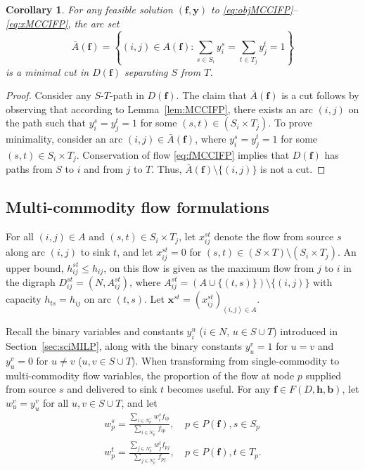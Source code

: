 \documentclass[pdflatex,sn-mathphys-num]{sn-jnl}%
\theoremstyle{thmstyleone}%
\newtheorem{corollary}[theorem]{Corollary}%
\begin{document}
\begin{corollary} \label{cor:MCCIFP}
For any feasible solution $(\boldsymbol{f},\boldsymbol{y})$ to \eqref{eq:objMCCIFP}--\eqref{eq:xMCCIFP},
the arc set \[\bar{A}(\boldsymbol{f})=\left\{(i,j)\in A(\boldsymbol{f}):\sum_{s\in S_i}y_i^s=\sum_{t\in T_j}y_j^t=1\right\}\] is a minimal cut in $D(\boldsymbol{f})$ separating $S$ from $T$.
\end{corollary}
\begin{proof}
Consider any $S$-$T$-path in $D(\boldsymbol{f})$.
The claim that $\bar{A}(\boldsymbol{f})$ is a cut follows by observing that according to Lemma~\ref{lem:MCCIFP}, there exists an arc $(i,j)$ on the path such that $y_i^s=y_j^t=1$ for some $(s,t)\in(S_i\times T_j)$.
To prove minimality, consider an arc $(i,j)\in\bar{A}(\boldsymbol{f})$, where $y_i^s=y_j^t=1$ for some $(s,t)\in S_i\times T_j$. Conservation of flow \eqref{eq:fMCCIFP} implies that $D(\boldsymbol{f})$ has paths from $S$ to $i$ and from $j$ to $T$. Thus, $\bar{A}(\boldsymbol{f})\setminus\{(i,j)\}$ is not a cut. 
\end{proof}

\subsection{Multi-commodity flow formulations} \label{sec:mciMILP}
For all $(i,j)\in A$ and $(s,t)\in S_i\times T_j$, let $x_{ij}^{st}$ denote the flow from source $s$ along arc $(i,j)$ to sink $t$,
and let $x_{ij}^{st}=0$ for $(s,t)\in (S\times T)\setminus(S_i\times T_j)$.
An upper bound, $h_{ij}^{st}\leq h_{ij}$, on this flow is given as the maximum flow from $j$ to $i$ in the digraph $D_{ij}^{st}=(N,A_{ij}^{st})$, where $A_{ij}^{st}=\left(A\cup\{(t,s)\}\right)\setminus\{(i,j)\}$ with capacity $h_{ts}=h_{ij}$ on arc $(t,s)$.
Let $\boldsymbol{x}^{st}=\left(x_{ij}^{st}\right)_{(i,j)\in A}$.

Recall the binary variables and constants $y_i^u$ ($i\in N$, $u\in S\cup T$) introduced in Section~\ref{sec:sciMILP},
along with the binary constants $y_u^v=1$ for $u=v$ and $y_u^v=0$ for $u\neq v$ ($u,v\in S\cup T$).
When transforming from single-commodity to multi-commodity flow variables, the proportion of the flow at node $p$ supplied from source $s$ and delivered to sink $t$ becomes useful.
For any $\boldsymbol{f}\in F(D,\boldsymbol{h},\boldsymbol{b})$, let $w_u^v=y_u^v$ for all $u,v\in S\cup T$, and let
\begin{eqnarray}
w_p^s = \frac{\sum_{i\in N_p^-}w_i^sf_{ip}}{\sum_{i\in N_p^-}f_{ip}}, & ~p\in P(\boldsymbol{f}), s\in S_p \label{eq:ws} \\
w_p^t = \frac{\sum_{j\in N_p^+}w_j^tf_{pj}}{\sum_{j\in N_p^+}f_{pj}}, & ~p\in P(\boldsymbol{f}), t\in T_p. \label{eq:wt}
\end{eqnarray}
\end{document}
